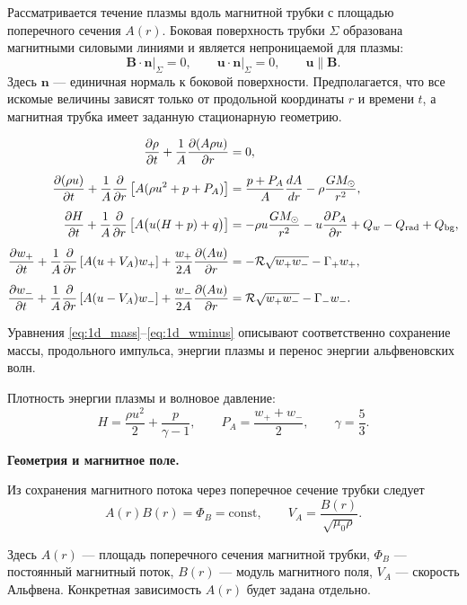\documentclass[12pt,a4paper]{article}
\newcommand{\vb}[1]{\bm{#1}}
\newcommand{\B}{\vb{B}}
\newcommand{\uvec}{\vb{u}}
\newcommand{\PA}{P_A}
\newcommand{\Rref}{\mathcal R}
\begin{document}
Рассматривается течение плазмы вдоль магнитной трубки
с площадью поперечного сечения $A(r)$.
Боковая поверхность трубки $\Sigma$ образована магнитными
силовыми линиями и является непроницаемой для плазмы:
\[
\left.\B\cdot\vb{n}\right|_\Sigma=0,
\qquad
\left.\uvec\cdot\vb{n}\right|_\Sigma=0,
\qquad
\uvec\parallel\B.
\]
Здесь $\vb{n}$ --- единичная нормаль к боковой поверхности.
Предполагается, что все искомые величины зависят только
от продольной координаты $r$ и времени $t$,
а магнитная трубка имеет заданную стационарную геометрию.

\begingroup
\small
\begin{align}
\frac{\partial\rho}{\partial t}
+\frac{1}{A}\frac{\partial(A\rho u)}{\partial r}
&=0,
\label{eq:1d_mass}\\[5pt]
\frac{\partial(\rho u)}{\partial t}
+\frac{1}{A}\frac{\partial}{\partial r}
\left[A(\rho u^2+p+\PA)\right]
&=\frac{p+\PA}{A}\frac{dA}{dr}
-\rho\frac{GM_\odot}{r^2},
\label{eq:1d_momentum}\\[5pt]
\frac{\partial H}{\partial t}
+\frac{1}{A}\frac{\partial}{\partial r}
\left[A\bigl(u(H+p)+q\bigr)\right]
&=-\rho u\frac{GM_\odot}{r^2}
-u\frac{\partial\PA}{\partial r}
+Q_w-Q_{\rm rad}+Q_{\rm bg},
\label{eq:1d_energy}\\[5pt]
\frac{\partial w_+}{\partial t}
+\frac{1}{A}\frac{\partial}{\partial r}
\left[A(u+V_A)w_+\right]
+\frac{w_+}{2A}\frac{\partial(Au)}{\partial r}
&=-\Rref\sqrt{w_+w_-}-\Gamma_+w_+,
\label{eq:1d_wplus}\\[5pt]
\frac{\partial w_-}{\partial t}
+\frac{1}{A}\frac{\partial}{\partial r}
\left[A(u-V_A)w_-\right]
+\frac{w_-}{2A}\frac{\partial(Au)}{\partial r}
&=\Rref\sqrt{w_+w_-}-\Gamma_-w_-.
\label{eq:1d_wminus}
\end{align}
\endgroup

Уравнения \eqref{eq:1d_mass}--\eqref{eq:1d_wminus}
описывают соответственно сохранение массы,
продольного импульса, энергии плазмы и перенос
энергии альфвеновских волн.

Плотность энергии плазмы и волновое давление:
\[
H=\frac{\rho u^2}{2}+\frac{p}{\gamma-1},
\qquad
\PA=\frac{w_++w_-}{2},
\qquad \gamma=\frac53.
\]

\medskip
\noindent\textbf{Геометрия и магнитное поле.}

Из сохранения магнитного потока через поперечное
сечение трубки следует
\[
A(r)B(r)=\Phi_B=\mathrm{const},
\qquad
V_A=\frac{B(r)}{\sqrt{\mu_0\rho}}.
\]

Здесь $A(r)$ --- площадь поперечного сечения
магнитной трубки, $\Phi_B$ --- постоянный магнитный поток,
$B(r)$ --- модуль магнитного поля, $V_A$ ---
скорость Альфвена. Конкретная зависимость $A(r)$
будет задана отдельно.
\end{document}
